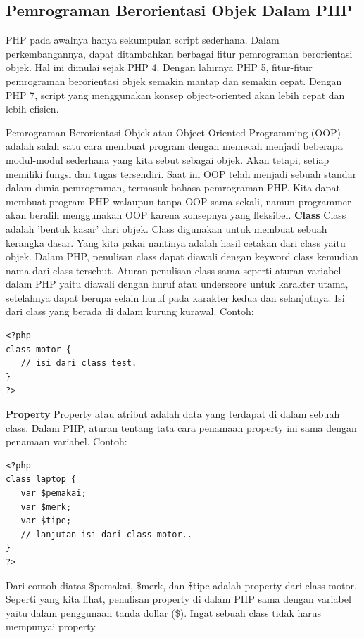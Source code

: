 \subsection{Pemrograman Berorientasi Objek Dalam PHP }
PHP pada awalnya hanya sekumpulan script sederhana. Dalam perkembangannya, dapat ditambahkan berbagai fitur pemrograman berorientasi objek. Hal ini dimulai sejak PHP 4. Dengan lahirnya PHP 5, fitur-fitur pemrograman berorientasi objek semakin mantap dan semakin cepat. Dengan PHP 7, script yang menggunakan konsep object-oriented akan lebih cepat dan lebih efisien.
\par
Pemrograman Berorientasi Objek atau Object Oriented Programming (OOP) adalah salah satu cara membuat program dengan memecah menjadi beberapa modul-modul sederhana yang kita sebut sebagai objek. Akan tetapi, setiap memiliki fungsi dan tugas tersendiri. Saat ini OOP telah menjadi sebuah standar dalam dunia pemrograman, termasuk bahasa pemrograman PHP. Kita dapat membuat program PHP walaupun tanpa OOP sama sekali, namun programmer akan beralih menggunakan OOP karena konsepnya yang fleksibel. 
\newline
\textbf{Class}
\newline
Class adalah 'bentuk kasar' dari objek. Class digunakan untuk membuat sebuah kerangka dasar. Yang kita pakai nantinya adalah hasil cetakan dari class yaitu objek. Dalam PHP, penulisan class dapat diawali dengan keyword class kemudian nama dari class tersebut. Aturan penulisan class sama seperti aturan variabel dalam PHP yaitu diawali dengan huruf atau underscore untuk karakter utama, setelahnya dapat berupa selain huruf pada karakter kedua dan selanjutnya.  Isi dari class yang berada di dalam kurung kurawal. Contoh:
\begin{lstlisting}
<?php
class motor {
   // isi dari class test.
}
?>
\end{lstlisting}
\textbf{Property}
\newline
Property atau atribut adalah data yang terdapat di dalam sebuah class. Dalam PHP, aturan tentang tata cara penamaan property ini sama dengan penamaan variabel. Contoh:
\begin{lstlisting}
<?php
class laptop {
   var $pemakai;
   var $merk;
   var $tipe;
   // lanjutan isi dari class motor..
}
?>
\end{lstlisting}
Dari contoh diatas \$pemakai, \$merk, dan \$tipe adalah property dari class motor. Seperti yang kita lihat, penulisan property di dalam PHP sama dengan variabel yaitu dalam penggunaan tanda dollar (\$). Ingat sebuah class tidak harus mempunyai property.

